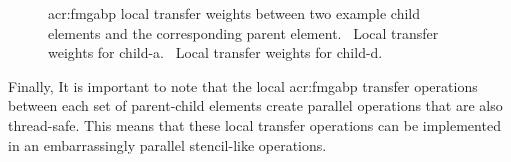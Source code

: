 \begin{figure}
	\centering
	{
	\vfil
	}
	\caption[The \acrshort{acr:fmgabp} local transfer operations.]{\gls{acr:fmgabp} local transfer weights between two example child elements and the corresponding parent element. \protect{}~Local transfer weights for child-a. \protect{}~Local transfer weights for child-d.}
	\label{fig:quadTrans}
\end{figure}

Finally, It is important to note that the local \gls{acr:fmgabp} transfer operations between each set of parent-child elements create parallel operations that are also thread-safe.
This means that these local transfer operations can be implemented in an embarrassingly parallel stencil-like operations.

